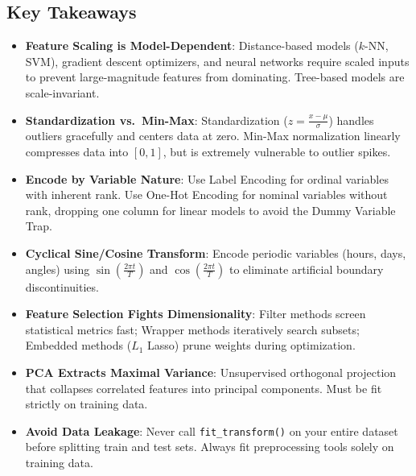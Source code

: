 \subsection{Key Takeaways}\label{subsec:feature_takeaways}

\begin{takeaways}
\begin{itemize}
    \item \textbf{Feature Scaling is Model-Dependent}: Distance-based models ($k$-NN, SVM), gradient descent optimizers, and neural networks require scaled inputs to prevent large-magnitude features from dominating. Tree-based models are scale-invariant.
    \item \textbf{Standardization vs.\ Min-Max}: Standardization ($z = \frac{x - \mu}{\sigma}$) handles outliers gracefully and centers data at zero. Min-Max normalization linearly compresses data into $[0, 1]$, but is extremely vulnerable to outlier spikes.
    \item \textbf{Encode by Variable Nature}: Use Label Encoding for ordinal variables with inherent rank. Use One-Hot Encoding for nominal variables without rank, dropping one column for linear models to avoid the Dummy Variable Trap.
    \item \textbf{Cyclical Sine/Cosine Transform}: Encode periodic variables (hours, days, angles) using $\sin\left(\frac{2\pi t}{T}\right)$ and $\cos\left(\frac{2\pi t}{T}\right)$ to eliminate artificial boundary discontinuities.
    \item \textbf{Feature Selection Fights Dimensionality}: Filter methods screen statistical metrics fast; Wrapper methods iteratively search subsets; Embedded methods ($L_1$ Lasso) prune weights during optimization.
    \item \textbf{PCA Extracts Maximal Variance}: Unsupervised orthogonal projection that collapses correlated features into principal components. Must be fit strictly on training data.
    \item \textbf{Avoid Data Leakage}: Never call \texttt{fit\_transform()} on your entire dataset before splitting train and test sets. Always fit preprocessing tools solely on training data.
\end{itemize}
\end{takeaways}

